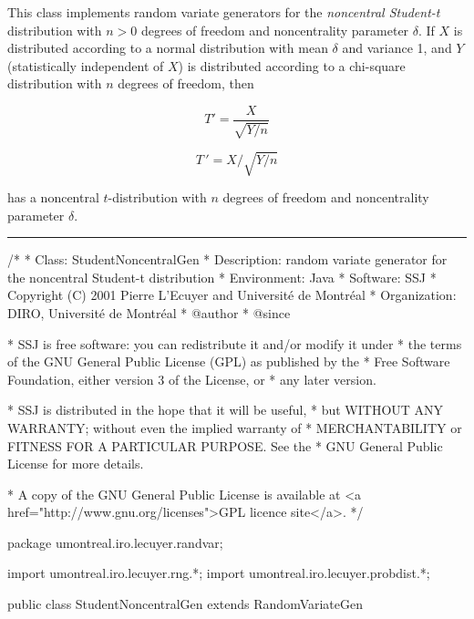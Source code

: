 
This class implements random variate generators for the 
\emph{noncentral Student-t} distribution with $n>0$ degrees of freedom and
noncentrality parameter $\delta$. If $X$ is distributed according to a 
normal distribution with mean  $\delta$ and variance 1, and $Y$ (statistically
independent of $X$) is distributed according to a chi-square distribution 
with $n$ degrees of freedom, then
\begin{latexonly}%
\[
             T{'} = \frac{X}{\sqrt{Y/n}}
\]
\end{latexonly}%
\begin{htmlonly}%
\[
             T\,' = {X} / {\sqrt{Y/n}}
\]
\end{htmlonly}%
has a noncentral $t$-distribution with $n$ degrees of freedom and 
noncentrality parameter  $\delta$.


\bigskip\hrule

\begin{code}
\begin{hide}
/*
 * Class:        StudentNoncentralGen
 * Description:  random variate generator for the noncentral Student-t distribution
 * Environment:  Java
 * Software:     SSJ 
 * Copyright (C) 2001  Pierre L'Ecuyer and Université de Montréal
 * Organization: DIRO, Université de Montréal
 * @author       
 * @since

 * SSJ is free software: you can redistribute it and/or modify it under
 * the terms of the GNU General Public License (GPL) as published by the
 * Free Software Foundation, either version 3 of the License, or
 * any later version.

 * SSJ is distributed in the hope that it will be useful,
 * but WITHOUT ANY WARRANTY; without even the implied warranty of
 * MERCHANTABILITY or FITNESS FOR A PARTICULAR PURPOSE.  See the
 * GNU General Public License for more details.

 * A copy of the GNU General Public License is available at
   <a href="http://www.gnu.org/licenses">GPL licence site</a>.
 */
\end{hide}
package umontreal.iro.lecuyer.randvar;\begin{hide}
import umontreal.iro.lecuyer.rng.*;
import umontreal.iro.lecuyer.probdist.*;
\end{hide}

public class StudentNoncentralGen extends RandomVariateGen \begin{hide} {
   private NormalGen normgen;
   private ChiSquareGen chigen;
   private int n;   // degrees of freedom of chi-square

   public double nextDouble()  {
      double x = normgen.nextDouble();
      double y = chigen.nextDouble();
      return x / Math.sqrt(y/n);
   }
\end{hide}
\end{code}

